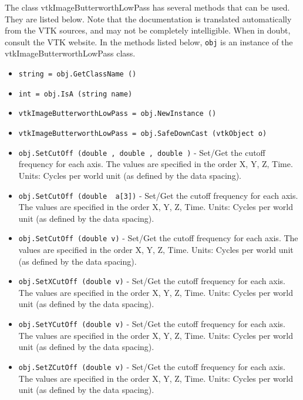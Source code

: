 The class vtkImageButterworthLowPass has several methods that can be used.
  They are listed below.
Note that the documentation is translated automatically from the VTK sources,
and may not be completely intelligible.  When in doubt, consult the VTK website.
In the methods listed below, \verb|obj| is an instance of the vtkImageButterworthLowPass class.
\begin{itemize}
\item  \verb|string = obj.GetClassName ()|

\item  \verb|int = obj.IsA (string name)|

\item  \verb|vtkImageButterworthLowPass = obj.NewInstance ()|

\item  \verb|vtkImageButterworthLowPass = obj.SafeDownCast (vtkObject o)|

\item  \verb|obj.SetCutOff (double , double , double )| -  Set/Get the cutoff frequency for each axis.
 The values are specified in the order X, Y, Z, Time.
 Units: Cycles per world unit (as defined by the data spacing).

\item  \verb|obj.SetCutOff (double  a[3])| -  Set/Get the cutoff frequency for each axis.
 The values are specified in the order X, Y, Z, Time.
 Units: Cycles per world unit (as defined by the data spacing).

\item  \verb|obj.SetCutOff (double v)| -  Set/Get the cutoff frequency for each axis.
 The values are specified in the order X, Y, Z, Time.
 Units: Cycles per world unit (as defined by the data spacing).

\item  \verb|obj.SetXCutOff (double v)| -  Set/Get the cutoff frequency for each axis.
 The values are specified in the order X, Y, Z, Time.
 Units: Cycles per world unit (as defined by the data spacing).

\item  \verb|obj.SetYCutOff (double v)| -  Set/Get the cutoff frequency for each axis.
 The values are specified in the order X, Y, Z, Time.
 Units: Cycles per world unit (as defined by the data spacing).

\item  \verb|obj.SetZCutOff (double v)| -  Set/Get the cutoff frequency for each axis.
 The values are specified in the order X, Y, Z, Time.
 Units: Cycles per world unit (as defined by the data spacing).


\end{itemize}

